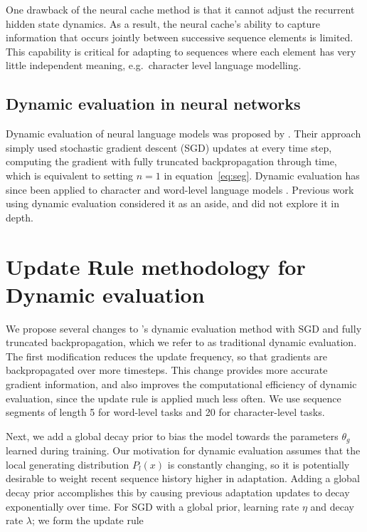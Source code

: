 \documentclass{article} %
\begin{document}
One drawback of the neural cache method is that it cannot adjust the recurrent hidden state dynamics. As a result, the neural cache's ability to capture information that occurs jointly between successive sequence elements is limited. This capability is critical for adapting to sequences where each element has very little independent meaning, e.g.\ character level language modelling. 


\subsection{Dynamic evaluation in neural networks}

Dynamic evaluation of neural language models was proposed by \citet{mikolov2010}. Their approach simply used stochastic gradient descent (SGD) updates at every time step, computing the gradient with fully truncated backpropagation through time, which is equivalent to setting $n\!=\!1$ in equation~\eqref{eq:seg}. Dynamic evaluation has since been applied to character and word-level language models \citep{Graves-2013,krause2017,ororbia2017,fortunato2017}. Previous work using dynamic evaluation considered it as an aside, and did not explore it in depth.




\section{Update Rule methodology for Dynamic evaluation}
\label{sec:updaterule}


We propose several changes to \citet{mikolov2010}'s dynamic evaluation method with SGD and fully truncated backpropagation, which we refer to as traditional dynamic evaluation. The first modification reduces the update frequency, so that gradients are backpropagated over more timesteps. This change provides more accurate gradient information, and also improves the computational efficiency of dynamic evaluation, since the update rule is applied much less often. We use sequence segments of length 5 for word-level tasks and 20 for character-level tasks. 

Next, we add a global decay prior to bias the model towards the parameters $\theta_g$ learned during training. Our motivation for dynamic evaluation assumes that the local generating distribution $P_l(x)$ is constantly changing, so it is potentially desirable to weight recent sequence history higher in adaptation. Adding a global decay prior accomplishes this by causing previous adaptation updates to decay exponentially over time. For SGD with a global prior, learning rate $\eta$ and decay rate $\lambda$; we form the update rule
\end{document}
